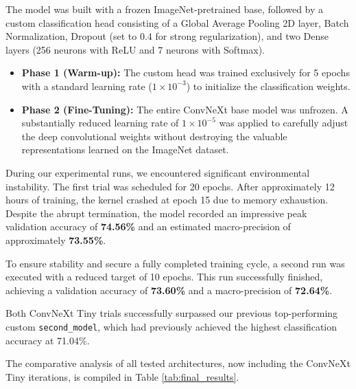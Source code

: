 \documentclass{article}
\begin{document}
The model was built with a frozen ImageNet-pretrained base, followed by a custom classification head consisting of a Global Average Pooling 2D layer, Batch Normalization, Dropout (set to 0.4 for strong regularization), and two Dense layers (256 neurons with ReLU and 7 neurons with Softmax).

\begin{itemize}
    \item \textbf{Phase 1 (Warm-up):} The custom head was trained exclusively for 5 epochs with a standard learning rate ($1 \times 10^{-3}$) to initialize the classification weights.
    \item \textbf{Phase 2 (Fine-Tuning):} The entire ConvNeXt base model was unfrozen. A substantially reduced learning rate of $1 \times 10^{-5}$ was applied to carefully adjust the deep convolutional weights without destroying the valuable representations learned on the ImageNet dataset.
\end{itemize}

During our experimental runs, we encountered significant environmental instability. The first trial was scheduled for 20 epochs. After approximately 12 hours of training, the kernel crashed at epoch 15 due to memory exhaustion. Despite the abrupt termination, the model recorded an impressive peak validation accuracy of \textbf{74.56\%} and an estimated macro-precision of approximately \textbf{73.55\%}. 

To ensure stability and secure a fully completed training cycle, a second run was executed with a reduced target of 10 epochs. This run successfully finished, achieving a validation accuracy of \textbf{73.60\%} and a macro-precision of \textbf{72.64\%}. 

Both ConvNeXt Tiny trials successfully surpassed our previous top-performing custom \texttt{second\_model}, which had previously achieved the highest classification accuracy at 71.04\%.

The comparative analysis of all tested architectures, now including the ConvNeXt Tiny iterations, is compiled in Table \ref{tab:final_results}.
\end{document}
